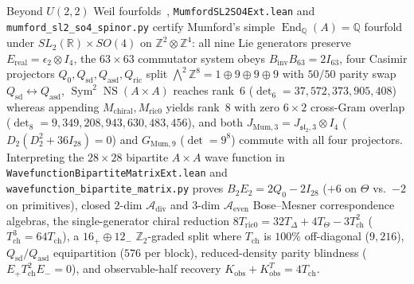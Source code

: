\documentclass[11pt,a4paper]{article}
\begin{document}
Beyond $U(2,2)$ Weil fourfolds~\cite{Markman2025,FloccariFu2025}, {\small\texttt{Mumford\allowbreak{}SL2SO4\allowbreak{}Ext.lean}} and {\small\texttt{mumford\_\allowbreak{}sl2\_\allowbreak{}so4\_\allowbreak{}spinor.py}} certify Mumford's simple $\operatorname{End}_{\mathbb{Q}}(A) = \mathbb{Q}$ fourfold under $SL_2(\mathbb{R}) \times SO(4)$ on $\mathbb{Z}^2 \otimes \mathbb{Z}^4$: all nine Lie generators preserve $E_{\mathrm{real}} = \epsilon_2 \otimes I_4$, the $63\times 63$ commutator system obeys $B_{\mathrm{inv}} B_{63} = 2 I_{63}$, four Casimir projectors $Q_0, Q_{\mathrm{sd}}, Q_{\mathrm{asd}}, Q_{\mathrm{ric}}$ split $\bigwedge^2 \mathbb{Z}^8 = 1 \oplus 9 \oplus 9 \oplus 9$ with $50/50$ parity swap $Q_{\mathrm{sd}} \leftrightarrow Q_{\mathrm{asd}}$, $\operatorname{Sym}^2 \operatorname{NS}(A\times A)$ reaches rank~$6$ ($\det_6 = 37{,}572{,}373{,}905{,}408$) whereas appending $M_{\mathrm{chiral}}, M_{\mathrm{ric0}}$ yields rank~$8$ with zero $6\times 2$ cross-Gram overlap ($\det_8 = 9{,}349{,}208{,}943{,}630{,}483{,}456$), and both $J_{\mathrm{Mum},3} = J_{\mathfrak{sl}_2,3} \otimes I_4$ ($D_2(D_2^2 + 36I_{28}) = 0$) and $G_{\mathrm{Mum},9}$ ($\det = 9^8$) commute with all four projectors. Interpreting the $28\times 28$ bipartite $A \times A$ wave function in {\small\texttt{Wavefunction\allowbreak{}Bipartite\allowbreak{}Matrix\allowbreak{}Ext.lean}} and {\small\texttt{wavefunction\_\allowbreak{}bipartite\_\allowbreak{}matrix.py}} proves $B_2 E_2 = 2Q_0 - 2I_{28}$ ($+6$ on $\Theta$ vs.\ $-2$ on primitives), closed $2$-dim $\mathcal{A}_{\mathrm{div}}$ and $3$-dim $\mathcal{A}_{\mathrm{even}}$ Bose--Mesner correspondence algebras, the single-generator chiral reduction $8 T_{\mathrm{ric0}} = 32 T_\Delta + 4 T_\Theta - 3 T_{\mathrm{ch}}^2$ ($T_{\mathrm{ch}}^3 = 64 T_{\mathrm{ch}}$), a $16_+ \oplus 12_-$ $\mathbb{Z}_2$-graded split where $T_{\mathrm{ch}}$ is $100\%$ off-diagonal ($9{,}216$), $Q_{\mathrm{sd}}/Q_{\mathrm{asd}}$ equipartition ($576$ per block), reduced-density parity blindness ($E_+ T_{\mathrm{ch}}^2 E_- = 0$), and observable-half recovery $K_{\mathrm{obs}} + K_{\mathrm{obs}}^T = 4 T_{\mathrm{ch}}$.
\end{document}
